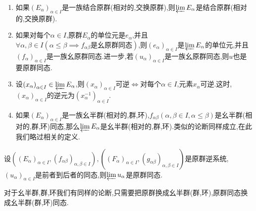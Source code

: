 \begin{remark}{}{}
	\begin{enumerate}
		\item 如果$\left(E_{\alpha}\right)_{\alpha\in I}$是一族结合原群(相对的,交换原群),则$\varprojlim E_{\alpha}$是结合原群(相对的,交换原群).
		\item 如果对每个$\alpha\in I$,原群$E_{\alpha}$的单位元是$e_{\alpha}$,并且$\forall\alpha,\beta\in I\left(\alpha\leq\beta\implies f_{\alpha\beta}\text{是幺原群同态}\right)$,则$\left(e_{\alpha}\right)_{\alpha\in I}$是$\varprojlim E_{\alpha}$的单位元,并且$\left(f_{\alpha}\right)_{\alpha\in I}$是一族幺原群同态.进一步,若$\left(u_{\alpha}\right)_{\alpha\in I}$是一族幺原群同态,则$u$也是要原群同态.
		\item 设$\left(x_{\alpha}\right)_{\alpha\in I}\in\varprojlim E_{\alpha}$,则$\left(x_{\alpha}\right)_{\alpha\in I}$可逆$\iff$对每个$\alpha\in I$,元素$x_{\alpha}$可逆.这时,$\left(x_{\alpha}\right)_{\alpha\in I}$的逆元为$\left(x_{\alpha}^{-1}\right)_{\alpha\in I}$.
		\item 如果$\left(E_{\alpha}\right)_{\alpha\in I}$是一族幺半群(相对的,群,环),$f_{\alpha\beta}(\alpha,\beta\in I,\alpha\leq\beta)$是幺半群(相对的,群,环)同态,那么$\varprojlim E_{\alpha}$是幺半群(相对的,群,环).类似的论断同样成立,在此我们略过相关的定义.
	\end{enumerate}
\end{remark}

\begin{proposition}{}{}
	设$\left(\left(E_{\alpha}\right)_{\alpha\in I},\left(f_{\alpha\beta}\right)_{\alpha,\beta\in I}\right),\left(\left(F_{\alpha}\right)_{\alpha\in I},\left(g_{\alpha\beta}\right)_{\alpha,\beta\in I}\right)$是原群逆系统,$\left(u_{\alpha}\right)_{\alpha\in I}$是前者到后者的同态,则$\varprojlim u_{\alpha}$是原群同态.
\end{proposition}

\begin{remark}{}{}
	对于幺半群,群,环我们有同样的论断,只需要把原群换成幺半群(群,环),原群同态换成幺半群(群,环)同态.
\end{remark}













